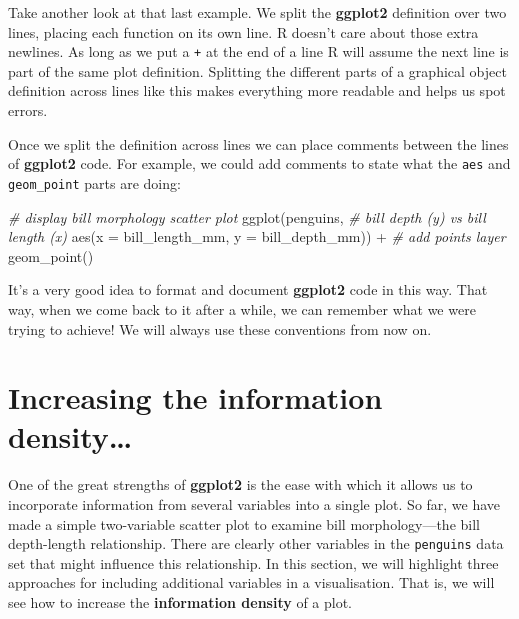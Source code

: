 \documentclass[
]{book}
\newenvironment{Shaded}{\begin{snugshade}}{\end{snugshade}}
\newcommand{\AttributeTok}[1]{\textcolor[rgb]{0.77,0.63,0.00}{#1}}
\newcommand{\CommentTok}[1]{\textcolor[rgb]{0.56,0.35,0.01}{\textit{#1}}}
\newcommand{\FunctionTok}[1]{\textcolor[rgb]{0.00,0.00,0.00}{#1}}
\newcommand{\NormalTok}[1]{#1}
\newcommand{\SpecialCharTok}[1]{\textcolor[rgb]{0.00,0.00,0.00}{#1}}
\begin{document}
Take another look at that last example. We split the \textbf{ggplot2} definition over two lines, placing each function on its own line. R doesn't care about those extra newlines. As long as we put a \texttt{+} at the end of a line R will assume the next line is part of the same plot definition. Splitting the different parts of a graphical object definition across lines like this makes everything more readable and helps us spot errors.

Once we split the definition across lines we can place comments between the lines of \textbf{ggplot2} code. For example, we could add comments to state what the \texttt{aes} and \texttt{geom\_point} parts are doing:

\begin{Shaded}
\begin{Highlighting}[]
\CommentTok{\# display bill morphology scatter plot}
\FunctionTok{ggplot}\NormalTok{(penguins, }
       \CommentTok{\# bill depth (y) vs bill length (x)}
       \FunctionTok{aes}\NormalTok{(}\AttributeTok{x =}\NormalTok{ bill\_length\_mm, }\AttributeTok{y =}\NormalTok{ bill\_depth\_mm)) }\SpecialCharTok{+} 
  \CommentTok{\# add points layer}
  \FunctionTok{geom\_point}\NormalTok{()}
\end{Highlighting}
\end{Shaded}

It's a very good idea to format and document \textbf{ggplot2} code in this way. That way, when we come back to it after a while, we can remember what we were trying to achieve! We will always use these conventions from now on.

\hypertarget{increasing-the-information-density}{%
\section{Increasing the information density\ldots{}}\label{increasing-the-information-density}}

One of the great strengths of \textbf{ggplot2} is the ease with which it allows us to incorporate information from several variables into a single plot. So far, we have made a simple two-variable scatter plot to examine bill morphology---the bill depth-length relationship. There are clearly other variables in the \texttt{penguins} data set that might influence this relationship. In this section, we will highlight three approaches for including additional variables in a visualisation. That is, we will see how to increase the \textbf{information density} of a plot.
\end{document}
